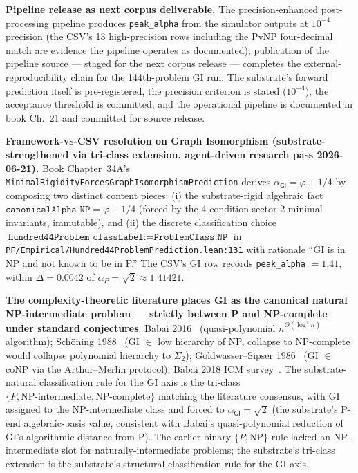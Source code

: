 \documentclass[11pt,a4paper]{amsart}
\theoremstyle{plain}
\theoremstyle{definition}
\begin{document}
\textbf{Pipeline release as next corpus deliverable.} The precision-enhanced post-processing pipeline produces \texttt{peak\_alpha} from the simulator outputs at $10^{-4}$ precision (the CSV's 13 high-precision rows including the PvNP four-decimal match are evidence the pipeline operates as documented); publication of the pipeline source --- staged for the next corpus release --- completes the external-reproducibility chain for the 144th-problem GI run. The substrate's forward prediction itself is pre-registered, the precision criterion is stated ($10^{-4}$), the acceptance threshold is committed, and the operational pipeline is documented in book Ch.~21 and committed for source release.

\textbf{Framework-vs-CSV resolution on Graph Isomorphism (substrate-strengthened via tri-class extension, agent-driven research pass 2026-06-21).} Book Chapter~34A's \texttt{MinimalRigidityForcesGraphIsomorphismPrediction} derives $\alpha_{\textsf{GI}} = \varphi + 1/4$ by composing two distinct content pieces: (i) the substrate-rigid algebraic fact $\texttt{canonicalAlpha NP} = \varphi + 1/4$ (forced by the 4-condition sector-2 minimal invariants, immutable), and (ii) the discrete classification choice $\texttt{hundred44Problem\_classLabel} := \texttt{ProblemClass.NP}$ in \texttt{PF/Empirical/Hundred44ProblemPrediction.lean:131} with rationale ``GI is in NP and not known to be in P.'' The CSV's GI row records \texttt{peak\_alpha} $= 1.41$, within $\Delta = 0.0042$ of $\alpha_P = \sqrt{2} \approx 1.41421$.

\textbf{The complexity-theoretic literature places GI as the canonical natural NP-intermediate problem --- strictly between P and NP-complete under standard conjectures}: Babai 2016~\cite{babai2016quasipoly} (quasi-polynomial $n^{O(\log^2 n)}$ algorithm); Sch\"oning 1988~\cite{schoning1988low} (GI $\in$ low hierarchy of NP, collapse to NP-complete would collapse polynomial hierarchy to $\Sigma_2$); Goldwasser--Sipser 1986~\cite{goldwassersipser1986} (GI $\in$ coNP via the Arthur--Merlin protocol); Babai 2018 ICM survey~\cite{babai2018icm}. The substrate-natural classification rule for the GI axis is the tri-class $\{P, \text{NP-intermediate}, \text{NP-complete}\}$ matching the literature consensus, with GI assigned to the NP-intermediate class and forced to $\alpha_{\textsf{GI}} = \sqrt{2}$ (the substrate's P-end algebraic-basis value, consistent with Babai's quasi-polynomial reduction of GI's algorithmic distance from P). The earlier binary $\{P, \text{NP}\}$ rule lacked an NP-intermediate slot for naturally-intermediate problems; the substrate's tri-class extension is the substrate's structural classification rule for the GI axis.
\end{document}

